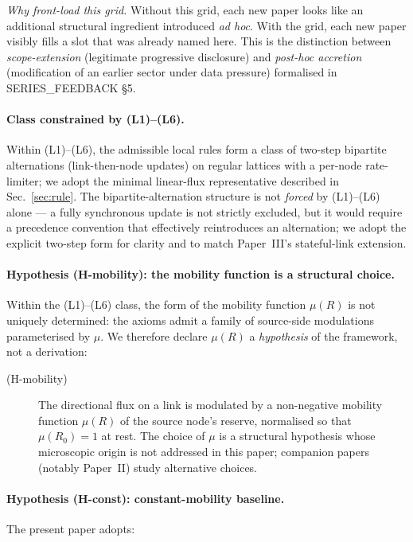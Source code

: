 \documentclass[11pt,a4paper]{article}
\begin{document}
\noindent\emph{Why front-load this grid.} Without this grid,
each new paper looks like an additional structural ingredient
introduced \emph{ad hoc}. With the grid, each new paper
visibly fills a slot that was already named here. This is the
distinction between \emph{scope-extension} (legitimate
progressive disclosure) and \emph{post-hoc accretion}
(modification of an earlier sector under data pressure)
formalised in SERIES\_FEEDBACK §5.

\paragraph{Class constrained by (L1)--(L6).}
Within (L1)--(L6), the admissible local rules form a class of
two-step bipartite alternations (link-then-node updates) on
regular lattices with a per-node rate-limiter; we adopt the
minimal linear-flux representative described in
Sec.~\ref{sec:rule}. The bipartite-alternation structure is not
\emph{forced} by (L1)--(L6) alone --- a fully synchronous update
is not strictly excluded, but it would require a precedence
convention that effectively reintroduces an alternation; we
adopt the explicit two-step form for clarity and to match
Paper~III's stateful-link extension.

\paragraph{Hypothesis (H-mobility): the mobility function is a
structural choice.}
Within the (L1)--(L6) class, the form of the mobility function
$\mu(R)$ is not uniquely determined: the axioms admit a family
of source-side modulations parameterised by $\mu$. We therefore
declare $\mu(R)$ a \emph{hypothesis} of the framework, not a
derivation:

\begin{description}
\item[(H-mobility)] The directional flux on a link is modulated
by a non-negative mobility function $\mu(R)$ of the source
node's reserve, normalised so that $\mu(R_0) = 1$ at rest. The
choice of $\mu$ is a structural hypothesis whose microscopic
origin is not addressed in this paper; companion papers
(notably Paper~II) study alternative choices.
\end{description}

\paragraph{Hypothesis (H-const): constant-mobility baseline.}
The present paper adopts:
\end{document}
